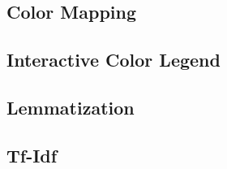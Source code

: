 \subsection{Color Mapping}

\subsection{Interactive Color Legend}

\subsection{Lemmatization}

\subsection{Tf-Idf}

\subsection{}



